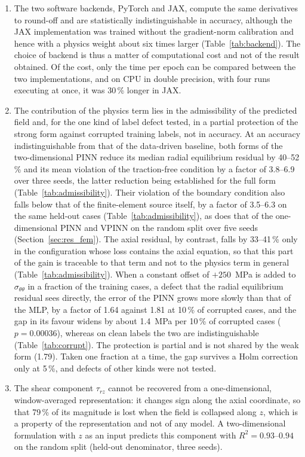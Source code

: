\documentclass[pdflatex,sn-basic,Numbered]{sn-jnl}
\begin{document}
\begin{enumerate}
\item The two software backends, PyTorch and JAX, compute the same derivatives to round-off and are statistically indistinguishable in accuracy, although the JAX implementation was trained without the gradient-norm calibration and hence with a physics weight about six times larger (Table~\ref{tab:backend}). The choice of backend is thus a matter of computational cost and not of the result obtained. Of the cost, only the time per epoch can be compared between the two implementations, and on CPU in double precision, with four runs executing at once, it was 30\,\% longer in JAX.

\item The contribution of the physics term lies in the admissibility of the predicted field and, for the one kind of label defect tested, in a partial protection of the strong form against corrupted training labels, not in accuracy. At an accuracy indistinguishable from that of the data-driven baseline, both forms of the two-dimensional PINN reduce its median radial equilibrium residual by 40--52\,\% and its mean violation of the traction-free condition by a factor of 3.8--6.9 over three seeds, the latter reduction being established for the full form (Table~\ref{tab:admissibility}). Their violation of the boundary condition also falls below that of the finite-element source itself, by a factor of 3.5--6.3 on the same held-out cases (Table~\ref{tab:admissibility}), as does that of the one-dimensional PINN and VPINN on the random split over five seeds (Section~\ref{sec:res_fem}). The axial residual, by contrast, falls by 33--41\,\% only in the configuration whose loss contains the axial equation, so that this part of the gain is traceable to that term and not to the physics term in general (Table~\ref{tab:admissibility}). When a constant offset of $+250$~MPa is added to $\sigma_{\theta\theta}$ in a fraction of the training cases, a defect that the radial equilibrium residual sees directly, the error of the PINN grows more slowly than that of the MLP, by a factor of 1.64 against 1.81 at 10\,\% of corrupted cases, and the gap in its favour widens by about 1.4~MPa per 10\,\% of corrupted cases ($p=0.00036$), whereas on clean labels the two are indistinguishable (Table~\ref{tab:corrupt}). The protection is partial and is not shared by the weak form (1.79). Taken one fraction at a time, the gap survives a Holm correction only at 5\,\%, and defects of other kinds were not tested.

\item The shear component $\tau_{rz}$ cannot be recovered from a one-dimensional, window-averaged representation: it changes sign along the axial coordinate, so that 79\,\% of its magnitude is lost when the field is collapsed along $z$, which is a property of the representation and not of any model. A two-dimensional formulation with $z$ as an input predicts this component with $R^2 = 0.93$--$0.94$ on the random split (held-out denominator, three seeds).

\end{enumerate}
\end{document}
